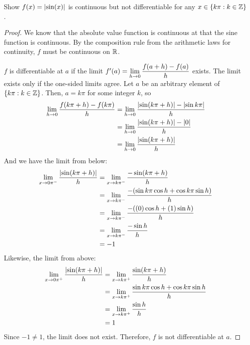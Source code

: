 \question Show $f(x) = \abs{\sin(x)}$ is continuous but not differentiable for any $x \in \{k\pi : k \in \mathbb{Z}\}$.
\begin{proof}
  We know that the absolute value function is continuous at that the sine function is continuous.
  By the composition rule from the arithmetic laws for continuity, $f$ must be continuous on $\mathbb{R}$.

  $f$ is differentiable at $a$ if the limit $f'(a)=\displaystyle\lim_{h\to0}\frac{f(a+h)-f(a)}{h}$ exists.
  The limit exists only if the one-sided limits agree.
  Let $a$ be an arbitrary element of $\{k\pi : k \in \mathbb{Z}\}$.
  Then, $a=k\pi$ for some integer $k$, so
  \begin{align*}
    \displaystyle\lim_{h\to0} \frac{f(k\pi+h)-f(k\pi)}{h}
     & = \displaystyle\lim_{h\to0} \frac{\abs{\sin(k\pi+h)}-\abs{\sin k\pi}}{h} \\
     & = \displaystyle\lim_{h\to0} \frac{\abs{\sin(k\pi+h)}-\abs{0}}{h}         \\
     & = \displaystyle\lim_{h\to0} \frac{\abs{\sin(k\pi+h)}}{h}
  \end{align*}
  And we have the limit from below:
  \begin{align*}
    \displaystyle\lim_{x\to0\pi^-} \frac{\abs{\sin(k\pi+h)}}{h}
     & = \displaystyle\lim_{x\to k\pi^-} \frac{-\sin(k\pi+h)}{h}                          \\
     & = \displaystyle\lim_{x\to k\pi^-} \frac{-(\sin k\pi \cos h + \cos k\pi \sin h)}{h} \\
     & = \displaystyle\lim_{x\to k\pi^-} \frac{-((0)\cos h + (1)\sin h)}{h}               \\
     & = \displaystyle\lim_{x\to k\pi^-} \frac{-\sin h}{h}                                \\
     & = -1
  \end{align*}
  Likewise, the limit from above:
  \begin{align*}
    \displaystyle\lim_{x\to0\pi^+} \frac{\abs{\sin(k\pi+h)}}{h}
     & = \displaystyle\lim_{x\to k\pi^+} \frac{\sin(k\pi+h)}{h}                        \\
     & = \displaystyle\lim_{x\to k\pi^+} \frac{\sin k\pi \cos h + \cos k\pi \sin h}{h} \\
     & = \displaystyle\lim_{x\to k\pi^+} \frac{\sin h}{h}                              \\
     & = 1
  \end{align*}
  Since $-1 \neq 1$, the limit does not exist.
  Therefore, $f$ is not differentiable at $a$.
\end{proof}

